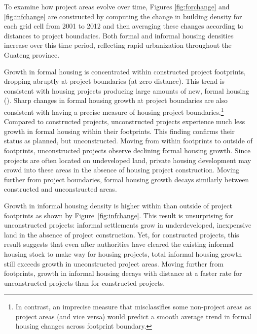 \documentclass[12pt]{article}
\begin{document}
To examine how project areas evolve over time, Figures \ref{fig:forchange} and \ref{fig:infchange} are constructed by computing the change in building density for each grid cell from 2001 to 2012 and then averaging these changes according to distances to project boundaries.  Both formal and informal housing densities increase over this time period, reflecting rapid urbanization throughout the Guateng province.  

Growth in formal housing is concentrated within constructed project footprints, dropping abruptly at project boundaries (at zero distance).   This trend is consistent with housing projects producing large amounts of new, formal housing  (\cite{dhsreports}).  Sharp changes in formal housing growth at project boundaries are also consistent with having a precise measure of housing project boundaries.\footnote{In contrast, an imprecise measure that misclassifies some non-project areas as project areas (and vice versa) would predict a smooth average trend in formal housing changes across footprint boundary.}  Compared to constructed projects, unconstructed projects experience much less growth in formal housing within their footprints.  This finding confirms their status as planned, but unconstructed.  Moving from within footprints to outside of footprints, unconstructed projects observe declining formal housing growth.  Since projects are often located on undeveloped land, private housing development may crowd into these areas in the absence of housing project construction.  Moving further from project boundaries, formal housing growth decays similarly between constructed and unconstructed areas.


Growth in informal housing density is higher within than outside of project footprints as shown by Figure~\ref{fig:infchange}.  This result is unsurprising for unconstructed projects:  informal settlements grow in underdeveloped, inexpensive land in the absence of project construction.  Yet, for constructed projects, this result suggests that even after authorities have cleared the existing informal housing stock to make way for housing projects, total informal housing growth still exceeds growth in unconstructed project areas.  Moving further from footprints, growth in informal housing decays with distance at a faster rate for unconstructed projects than for constructed projects.  
\end{document}
